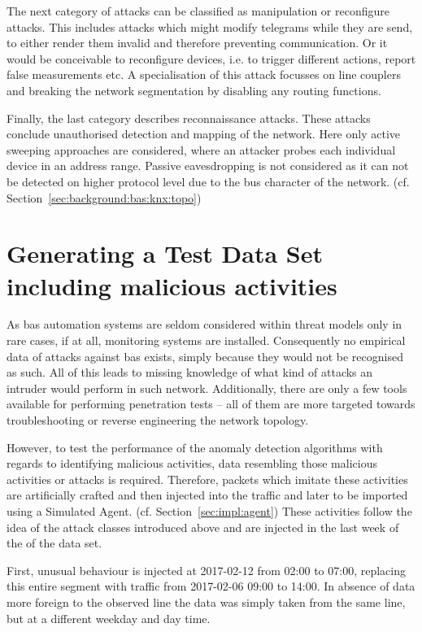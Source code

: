 The next category of attacks can be classified as manipulation or reconfigure attacks. This includes attacks which might modify telegrams while they are send, to either render them invalid and therefore preventing communication. Or it would be conceivable to reconfigure devices, i.e. to trigger different actions, report false measurements etc. A specialisation of this attack focusses on line couplers and breaking the network segmentation by disabling any routing functions.

Finally, the last category describes reconnaissance attacks. These attacks conclude unauthorised detection and mapping of the network. Here only active sweeping approaches are considered, where an attacker probes each individual device in an address range.
Passive eavesdropping is not considered as it can not be detected on higher protocol level due to the bus character of the network. (cf. Section~\ref{sec:background:bas:knx:topo})

\section{Generating a Test Data Set including malicious activities}
\label{sec:methods:gen-test}

As \gls{bas} automation systems are seldom considered within threat models only in rare cases, if at all, monitoring systems are installed.
Consequently no empirical data of attacks against \gls{bas} exists, simply because they would not be recognised as such.
All of this leads to missing knowledge of what kind of attacks an intruder would perform in such network.
Additionally, there are only a few tools available for performing penetration tests -- all of them are more targeted towards troubleshooting or reverse engineering the network topology.

However, to test the performance of the anomaly detection algorithms with regards to identifying malicious activities, data resembling those malicious activities or attacks is required.
Therefore, packets which imitate these activities are artificially crafted and then injected into the traffic and later to be imported using a Simulated Agent. (cf. Section~\ref{sec:impl:agent})
These activities follow the idea of the attack classes introduced above and are injected in the last week of the of the data set.

First, unusual behaviour is injected at 2017-02-12 from 02:00 to 07:00, replacing this entire segment with traffic from 2017-02-06 09:00 to 14:00. In absence of data more foreign to the observed line the data was simply taken from the same line, but at a different weekday and day time.

